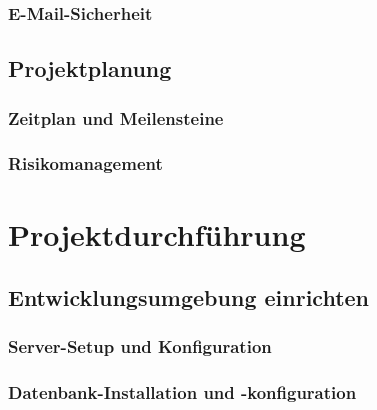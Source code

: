 \documentclass[11pt,a4paper]{article}
\begin{document}
\subsubsection{E-Mail-Sicherheit}

\subsection{Projektplanung}

\subsubsection{Zeitplan und Meilensteine}

\subsubsection{Risikomanagement}

\newpage
\section{Projektdurchführung}

\subsection{Entwicklungsumgebung einrichten}

\subsubsection{Server-Setup und Konfiguration}

\subsubsection{Datenbank-Installation und -konfiguration}
\end{document}
